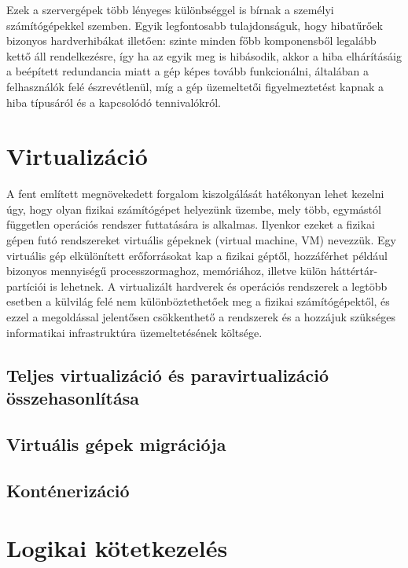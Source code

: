 Ezek a szervergépek több lényeges különbséggel is bírnak a személyi számítógépekkel szemben. Egyik legfontosabb tulajdonságuk, hogy hibatűrőek bizonyos hardverhibákat illetően: szinte minden főbb komponensből legalább kettő áll rendelkezésre, így ha az egyik meg is hibásodik, akkor a hiba elhárításáig a beépített redundancia miatt a gép képes tovább funkcionálni, általában a felhasználók felé észrevétlenül, míg a gép üzemeltetői figyelmeztetést kapnak a hiba típusáról és a kapcsolódó tennivalókról.

\section{Virtualizáció}
A fent említett megnövekedett forgalom kiszolgálását hatékonyan lehet kezelni úgy, hogy olyan fizikai számítógépet helyezünk üzembe, mely  több, egymástól független operációs rendszer futtatására is alkalmas. Ilyenkor ezeket a fizikai gépen futó rendszereket virtuális gépeknek (virtual machine, VM) %
nevezzük. Egy virtuális gép elkülönített erőforrásokat kap a fizikai géptől, hozzáférhet például bizonyos mennyiségű processzormaghoz, memóriához, illetve külön háttértár-partíciói is lehetnek. A virtualizált hardverek és operációs rendszerek a legtöbb esetben a külvilág felé nem különböztethetőek meg a fizikai számítógépektől, és ezzel a megoldással jelentősen csökkenthető a rendszerek és a hozzájuk szükséges informatikai infrastruktúra üzemeltetésének költsége.


\subsection{Teljes virtualizáció és paravirtualizáció összehasonlítása}
\subsection{Virtuális gépek migrációja}
\subsection{Konténerizáció}

\section{Logikai kötetkezelés}
